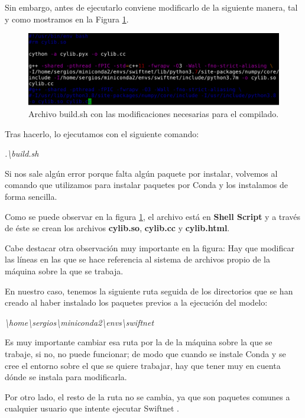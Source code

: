 Sin embargo, antes de ejecutarlo conviene modificarlo de la siguiente manera, tal y como mostramos en la Figura \ref{fig:cylib}.

\begin{figure}[H]
  \centering
  \includegraphics[width=12cm]{Figuras/cylib.eps}
  \caption{Archivo build.sh con las modificaciones necesarias para el compilado.}
  \label{fig:cylib}
\end{figure}

Tras hacerlo, lo ejecutamos con el siguiente comando:

\begin{center}
\textit{.\textbackslash{build.sh}}
\end{center}

Si nos sale algún error porque falta algún paquete por instalar, volvemos al comando que utilizamos para instalar paquetes por Conda y los instalamos de forma sencilla.

Como se puede observar en la figura \ref{fig:cylib}, el archivo está en \textbf{Shell Script} \cite{shell} y a través de éste se crean los archivos \textbf{cylib.so}, \textbf{cylib.cc} y \textbf{cylib.html}.

Cabe destacar otra observación muy importante en la figura: Hay que modificar las líneas en las que se hace referencia al sistema de archivos propio de la máquina sobre la que se trabaja.

En nuestro caso, tenemos la siguiente ruta seguida de los directorios que se han creado al haber instalado los paquetes previos a la ejecución del modelo:

\begin{center}
\textit{\textbackslash{home}\textbackslash{sergios}\textbackslash{miniconda2}\textbackslash{envs}\textbackslash{swiftnet}}
\end{center}

Es muy importante cambiar esa ruta por la de la máquina sobre la que se trabaje, si no, no puede funcionar; de modo que cuando se instale Conda y se cree el entorno sobre el que se quiere trabajar, hay que tener muy en cuenta dónde se instala para modificarla.

Por otro lado, el resto de la ruta no se cambia, ya que son paquetes comunes a cualquier usuario que intente ejecutar Swiftnet \cite{swiftnet}.

